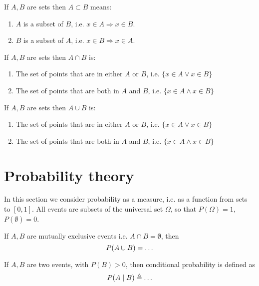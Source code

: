 \documentclass[a4paper]{article}
\begin{document}
\begin{exercise}
  If $A, B$ are sets then
  $A \subset B$ means:
  \begin{enumerate}
  \item $A$ is a subset of $B$, i.e. $x \in A \Rightarrow x \in B$.
  \item $B$ is a subset of $A$, i.e. $x \in B \Rightarrow x \in A$.
  \end{enumerate}
\end{exercise}


\begin{exercise}
  If $A, B$ are sets then
  $A \cap B$ is:
  \begin{enumerate}
  \item The set of points that are in either $A$ or $B$, i.e. $\{x \in A \vee x \in B\}$
  \item The set of points that are both in $A$ and $B$, i.e. $\{x \in A \wedge x \in B\}$ 
  \end{enumerate}
\end{exercise}

\begin{exercise}
  If $A, B$ are sets then
  $A \cup B$ is:
  \begin{enumerate}
  \item The set of points that are in either $A$ or $B$, i.e. $\{x \in A \vee x \in B\}$
  \item The set of points that are both in $A$ and $B$, i.e. $\{x \in A \wedge x \in B\}$ 
  \end{enumerate}
\end{exercise}



\section{Probability theory}
In this section we consider probability as a measure, i.e. as a function from sets to $[0,1]$. All events are subsets of the universal set $\Omega$, so that $P(\Omega) = 1$, $P(\emptyset) = 0$.
\begin{exercise}
  If $A, B$ are mutually exclusive events i.e. $A \cap B = \emptyset$,  then 
  \[
  P(A \cup B) =
  \ifdefined \solution
  P(A) + P(B)
  \else
  \ldots
  \fi
  \]
\end{exercise}

\begin{exercise}
  If $A, B$ are two events, with $P(B) > 0$, then conditional probability is defined as
  \[
  P(A \mid B) \defn 
  \ifdefined \solution
  \frac{P(A \cap B)}{P(B)}
  \else
  \ldots
  \fi
  \]
\end{exercise}
\end{document}
